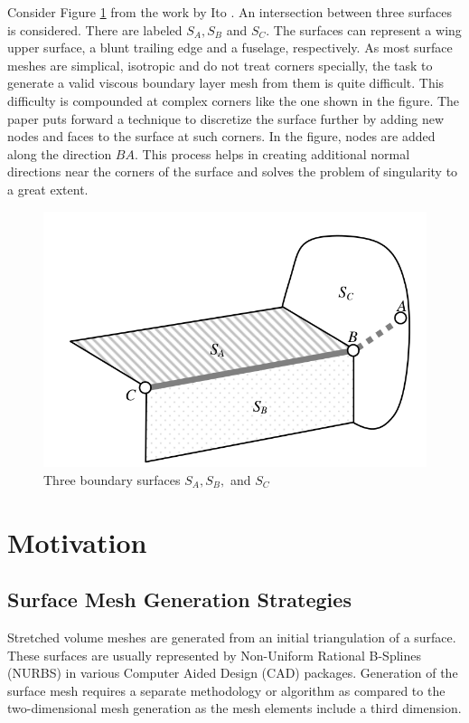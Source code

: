 Consider Figure \ref{fig-cornerIto} from the work by Ito \etal \cite{ito2007multiple}. An intersection between three surfaces is considered. There are labeled $S_A, S_B$ and $S_C$. The surfaces can represent a wing upper surface, a blunt trailing edge and a fuselage, respectively. As most surface meshes are simplical, isotropic and do not treat corners specially, the task to generate a valid viscous boundary layer mesh from them is quite difficult. This difficulty is compounded at complex corners like the one shown in the figure. The paper puts forward a technique to discretize the surface further by adding new nodes and faces to the surface at such corners. In the figure, nodes are added along the direction $BA$. This process helps in creating additional normal directions near the corners of the surface and solves the problem of singularity to a great extent.

\begin{figure}
	\centering
	\includegraphics[width=0.8\linewidth]{img/intro/lit/cornerIto.png}
	\caption{Three boundary surfaces $S_A, S_B, $ and $S_C$ \cite{ito2007multiple}}
	\label{fig-cornerIto}
\end{figure}

\section{Motivation}
\label{sec-motivation}

\subsection{Surface Mesh Generation Strategies}

Stretched volume meshes are generated from an initial triangulation of a surface. These surfaces are usually represented by Non-Uniform Rational B-Splines (NURBS) in various Computer Aided Design (CAD) packages. Generation of the surface mesh requires a separate methodology or algorithm as compared to the two-dimensional mesh generation as the mesh elements include a third dimension.

